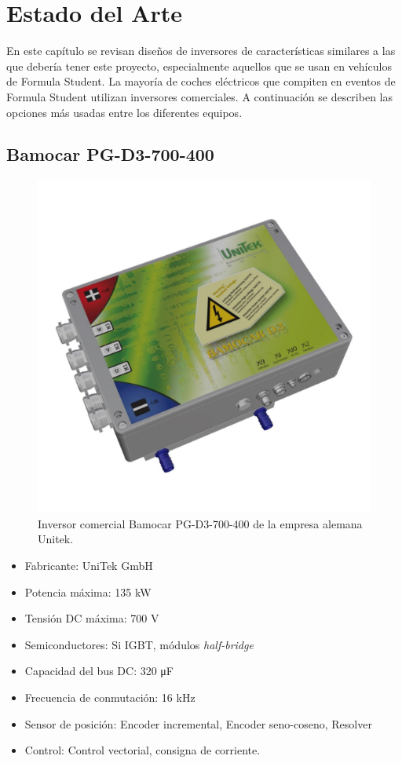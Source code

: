 \chapter{Estado del Arte}

En este capítulo se revisan diseños de inversores de características similares a las que debería tener este proyecto, especialmente aquellos que se usan en vehículos de Formula Student. La mayoría de coches eléctricos que compiten en eventos de Formula Student utilizan inversores comerciales. A continuación se describen las opciones más usadas entre los diferentes equipos.

\section{Bamocar PG-D3-700-400}
\begin{figure}[H]
	\centering
	\includegraphics[width=0.6\linewidth]{fig/unitek}
	\caption{Inversor comercial Bamocar PG-D3-700-400 de la empresa alemana Unitek. \cite{unitek_produkte}}
	\label{fig:unitek}
\end{figure}

\begin{itemize}
	\item Fabricante: UniTek GmbH
	\item Potencia máxima: 135 kW
	\item Tensión DC máxima: 700 V
	\item Semiconductores: Si IGBT, módulos \textit{half-bridge}
	\item Capacidad del bus DC: 320 \unit{\micro\farad}
	\item Frecuencia de conmutación: 16 kHz
	\item Sensor de posición: Encoder incremental, Encoder seno-coseno, Resolver
	\item Control: Control vectorial, consigna de corriente.
\end{itemize}

